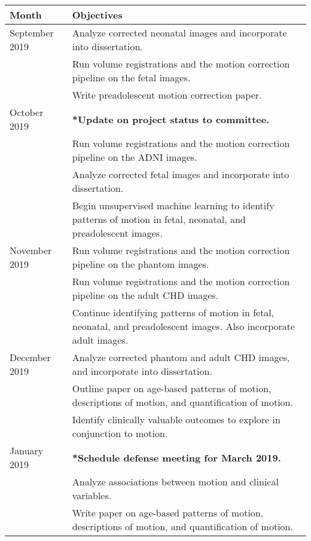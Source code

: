 \begin{table}[t]
\begin{tabular}{p{}|p{}}
\textbf{Month} & \multicolumn{1}{l}{\textbf{Objectives}}                                                                         \\ \hline
September 2019 & Analyze corrected neonatal images and incorporate into dissertation. \\
               & Run volume registrations and the motion correction pipeline on the fetal images. \\
               & Write preadolescent motion correction paper.                                                                     \\ \hline
October 2019   & \textbf{*Update on project status to committee.} \\                                             
               & Run volume registrations and the motion correction pipeline on the ADNI images.                                  \\
               & Analyze corrected fetal images and incorporate into dissertation.                                                                                  \\
               & Begin unsupervised machine learning to identify patterns of motion in fetal, neonatal, and preadolescent images.  
\\ \hline
November 2019  & Run volume registrations and the motion correction pipeline on the phantom images.                                   \\
              & Run volume registrations and the motion correction pipeline on the adult CHD images.                                 \\
   & Continue identifying patterns of motion in fetal, neonatal, and preadolescent images. Also incorporate adult images. \\ \hline

December 2019  & Analyze corrected phantom and adult CHD images, and incorporate into dissertation.                                                                      \\
       & Outline paper on age-based patterns of motion, descriptions of motion, and quantification of motion.                 \\
            & Identify clinically valuable outcomes to explore in conjunction to motion.                                           \\ \hline
January 2019  & \textbf{*Schedule defense meeting for March 2019.}                                                                   \\
          & Analyze associations between motion and clinical variables.                                                          \\
           & Write paper on age-based patterns of motion, descriptions of motion, and quantification of motion.                   \\ \hline


\end{tabular}
\end{table}
